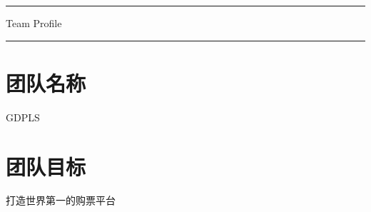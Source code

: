 \documentclass[a4paper]{article}
\begin{document}
  \thispagestyle{empty}
  \begin{center}
    {\rule{\textwidth}{0.2em}}
    {\Huge\yahei
    {Team Profile}}
    {\rule{\textwidth}{0.2em}}
  \end{center}
  \section{团队名称}
  GDPLS
  \section{团队目标}
  打造世界第一的购票平台
\end{document}
